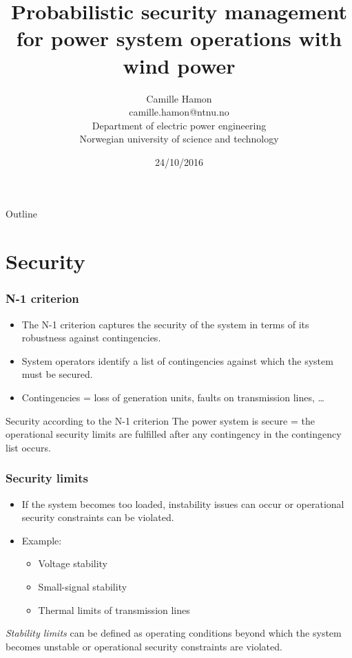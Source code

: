 \documentclass{beamer}
\title{Probabilistic security management for power system operations with  wind power}
\author[Camille Hamon]{Camille Hamon\\
camille.hamon@ntnu.no\\
Department of electric power engineering\\
Norwegian university of science and technology}
\date[24/10/2016]{24/10/2016}
\begin{document}
\begin{frame}[plain]
  \titlepage
\end{frame}

\begin{frame}{Outline}
  \tableofcontents[subsectionstyle=hide]
\end{frame}

\section{Security}

\begin{frame}
\frametitle{N-1 criterion}
\begin{itemize}
\item The N-1 criterion captures the security of the system in terms of its robustness against contingencies. 
\item System operators identify a list of contingencies against which the system must be secured.
\item Contingencies = loss of generation units, faults on transmission lines, \ldots
\end{itemize}

\begin{block}{Security according to the N-1 criterion}
  The power system is secure = the operational security limits are fulfilled after any contingency in the contingency list occurs.
\end{block}

\end{frame}


\begin{frame}
\frametitle{Security limits}
\begin{itemize}
\item If the system becomes too loaded, instability issues can occur or operational security constraints can be violated.
\item Example:
\begin{itemize}
\item Voltage stability
\item Small-signal stability
\item Thermal limits of transmission lines
\end{itemize}
\end{itemize}
\emph{Stability limits} can be defined as operating conditions beyond which the system becomes unstable or operational security constraints are violated.
\end{frame}
\end{document}
